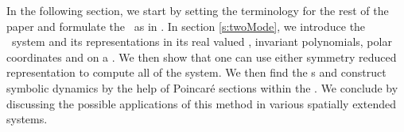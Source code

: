 In the following section, we start by setting the terminology for the rest
of the paper and formulate the \mslices\ as in . In
section \ref{s:twoMode}, we introduce the \twoMode\ system and its representations
in its real valued \statesp , invariant polynomials, polar coordinates and
on a \slice . We then show that one can use either symmetry reduced representation
to compute all \reqva of the system. We then find the \rpo s and construct
symbolic dynamics by the help of Poincar\'e sections within the \slice .
We conclude by discussing the possible applications of this method in various
spatially extended systems.
